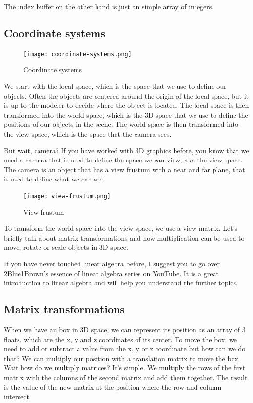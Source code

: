 \documentclass[12pt]{report} \usepackage{preamble}
\begin{document}
The index buffer on the other hand is just an simple array of integers.
\cite{vulkan-tutorial-index-buffer}


\subsection{Coordinate systems}

\begin{figure}[hbtp]
	\centering \texttt{[image: coordinate-systems.png]}
	\caption{Coordinate systems \cite{fig:view-frustum}}
\end{figure}
\Floatbarrier

We start with the local space, which is the space that we use to define
our objects. Often the objects are centered around the origin of the
local space, but it is up to the modeler to decide where the object is
located. The local space is then transformed into the world space, which
is the 3D space that we use to define the positions of our objects in the scene.
The world space is then transformed into the view space, which is the space that the
camera sees. \cite{fig:view-frustum}

But wait, camera? If you have worked with 3D graphics before, you know
that we need a camera that is used to define the space we can view, aka
the view space. The camera is an object that has a view frustum
with a near and far plane, that is used to define what we can see.

\begin{figure}[hbtp]
	\centering \texttt{[image: view-frustum.png]}
	\caption{View frustum \cite{fig:view-frustum}}
\end{figure}
\Floatbarrier

To transform the world space into the view space, we use a view matrix.
Let's briefly talk about matrix transformations and how multiplication
can be used to move, rotate or scale objects in 3D space.

If you have never touched linear algebra before, I suggest you to go over
2Blue1Brown's essence of linear algebra series on YouTube. It is a great
introduction to linear algebra and will help you understand the further topics.

\subsection{Matrix transformations}

When we have an box in 3D space, we can represent its position as an
array of 3 floats, which are the x, y and z coordinates of its center.
To move the box, we need to add or subtract a value from the x, y or
z coordinate but how can we do that? We can multiply our position with a translation matrix to
move the box. Wait how do we multiply matrices? It's simple. We multiply
the rows of the first matrix with the columns of the second matrix and add them
together. The result is the value of the new matrix at the position where the row and
column intersect.
\end{document}
